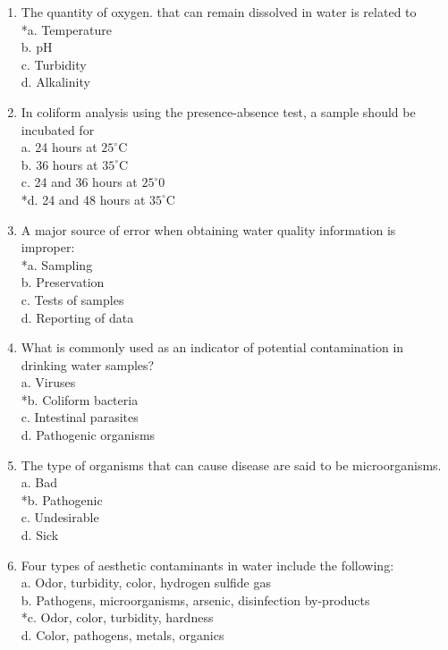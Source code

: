\begin{enumerate}[1.]
\item The quantity of oxygen. that can remain dissolved in water is related to\\
*a. Temperature\\
b. $\mathrm{pH}$\\
c. Turbidity\\
d. Alkalinity\\
\item In coliform analysis using the presence-absence test, a sample should be incubated for\\
a. 24 hours at $25^{\circ} \mathrm{C}$\\
b. 36 hours at $35^{\circ} \mathrm{C}$\\
c. 24 and 36 hours at $25^{\circ} 0$\\
*d. 24 and 48 hours at $35^{\circ} \mathrm{C}$\\
\item A major source of error when obtaining water quality information is improper:\\
*a. Sampling\\
b. Preservation\\
c. Tests of samples\\
d. Reporting of data\\
\item What is commonly used as an indicator of potential contamination in drinking water samples?\\
a. Viruses\\
*b. Coliform bacteria\\
c. Intestinal parasites\\
d. Pathogenic organisms\\
\item The type of organisms that can cause disease are said to be microorganisms.\\
a. Bad\\
*b. Pathogenic\\
c. Undesirable\\
d. Sick\\
\item Four types of aesthetic contaminants in water include the following:\\
a. Odor, turbidity, color, hydrogen sulfide gas\\
b. Pathogens, microorganisms, arsenic, disinfection by-products\\
*c. Odor, color, turbidity, hardness\\
d. Color, pathogens, metals, organics\\

\end{enumerate}
